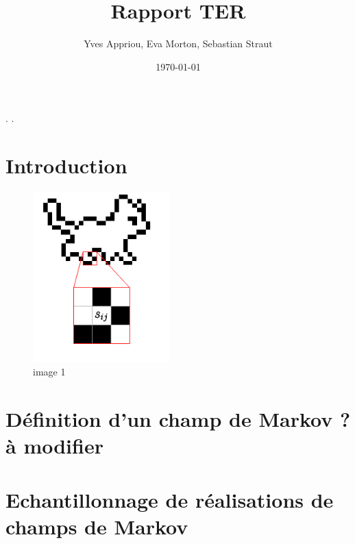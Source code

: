 \documentclass[a4paper, 12pt]{article}
\title{Rapport TER}
\author{Yves Appriou, Eva Morton, Sebastian Straut}
\date{\today}
\begin{document}
\maketitle

\tableofcontents.
\newpage.
\section{Introduction}
\begin{figure}
  \begin{center}
    \includegraphics[width=200px]{images/figure1.png}
  \end{center}
  \caption{image 1}
\end{figure}
\section{Définition d'un champ de Markov ?à modifier}
\section{Echantillonnage de réalisations de champs de Markov}
\end{document}
